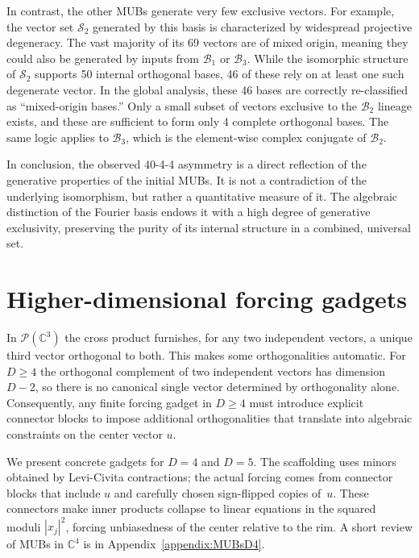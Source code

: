 \documentclass[%
  reprint,
  superscriptaddress,
  showpacs,
  showkeys,
  amsmath,amssymb,
  pra,
  longbibliography,
  floatfix,
  x11names
]{revtex4-2}
\begin{document}

In contrast, the other MUBs generate very few exclusive vectors. For example,
the vector set $\mathcal{S}_2$ generated by this basis is characterized by widespread projective degeneracy.
The vast majority of its 69 vectors are of mixed origin, meaning they could also be generated by inputs from $\mathcal{B}_1$ or $\mathcal{B}_3$. While the isomorphic structure of $\mathcal{S}_2$ supports 50 internal orthogonal bases, 46 of these rely on at least one such degenerate vector. In the global analysis, these 46 bases are correctly re-classified as ``mixed-origin bases.'' Only a small subset of vectors exclusive to the $\mathcal{B}_2$ lineage exists, and these are sufficient to form only 4 complete orthogonal bases. The same logic applies to $\mathcal{B}_3$, which is the element-wise complex conjugate of $\mathcal{B}_2$.

In conclusion, the observed  40-4-4  asymmetry is a direct reflection of the generative properties of the initial MUBs.
It is not a contradiction of the underlying isomorphism, but rather a quantitative measure of it.
The algebraic distinction of the Fourier basis endows it with a high degree of generative exclusivity,
preserving the purity of its internal structure in a combined, universal set.






\section{Higher-dimensional forcing gadgets}
\label{2025-hdfg}

In $\mathcal{P}(\mathbb{C}^3)$ the cross product furnishes, for any two independent vectors, a unique third vector orthogonal to both.
This makes some orthogonalities automatic.
For $D \ge 4$ the orthogonal complement of two independent vectors has dimension $D-2$,
so there is no canonical single vector determined by orthogonality alone.
Consequently, any finite forcing gadget in $D \ge 4$ must introduce explicit connector blocks to
impose additional orthogonalities that translate into algebraic constraints on the center vector $u$.

We present concrete gadgets for $D=4$ and $D=5$.
The scaffolding uses minors obtained by Levi-Civita contractions;
the actual forcing comes from connector blocks that include $u$ and carefully chosen sign-flipped copies of~$u$.
These connectors make inner products collapse to linear equations in the squared moduli $|x_j|^2$,
forcing unbiasedness of the center relative to the rim.
A short review of MUBs in $\mathbb{C}^4$ is in Appendix~\ref{appendix:MUBsD4}.
\end{document}
